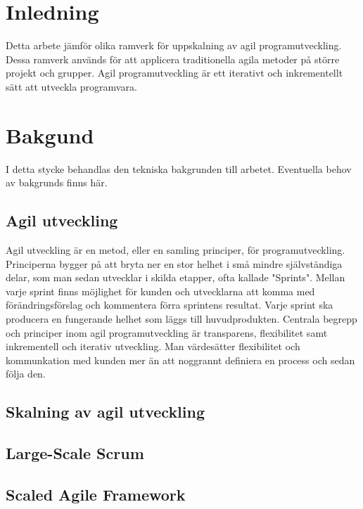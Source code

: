 \section{Inledning}

Detta arbete jämför olika ramverk för uppskalning av agil programutveckling. Dessa ramverk används för att applicera traditionella agila metoder på större projekt och grupper.
Agil programutveckling är ett iterativt och inkrementellt sätt att utveckla programvara.

\newpage

\section{Bakgund} 	


I detta stycke behandlas den tekniska bakgrunden till arbetet. Eventuella behov av bakgrunds finns här.

\subsection{Agil utveckling}

Agil utveckling är en metod, eller en samling principer, för programutveckling. Principerna bygger på att bryta ner en stor helhet i små mindre självständiga delar, som man sedan utvecklar i skilda etapper, ofta kallade "Sprints".
Mellan varje sprint finns möjlighet för kunden och utvecklarna att komma med förändringsförslag och kommentera förra sprintens resultat. Varje sprint ska producera en fungerande helhet som läggs till huvudprodukten. Centrala begrepp och principer inom agil programutveckling är transparens, flexibilitet samt inkrementell och iterativ utveckling. Man värdesätter flexibilitet och kommunkation med kunden mer än att noggrannt definiera en process och sedan följa den. \cite{agile_manifesto}

\subsection{Skalning av agil utveckling}


\subsection{Large-Scale Scrum}


\subsection{Scaled Agile Framework}


